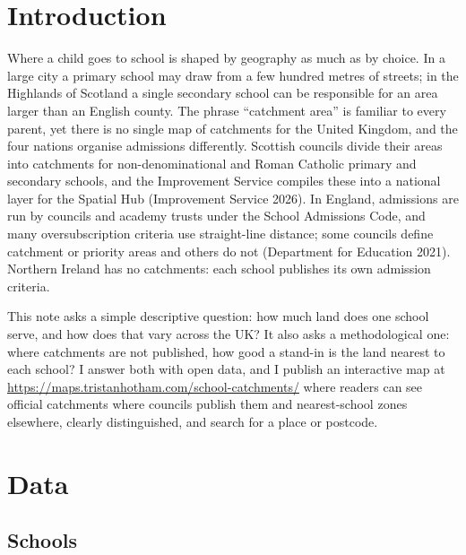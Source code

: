 \documentclass[11pt,a4paper]{article}
\begin{document}
\section{Introduction}

Where a child goes to school is shaped by geography as much as by choice. In a large city a primary school may draw from a few hundred metres of streets; in the Highlands of Scotland a single secondary school can be responsible for an area larger than an English county. The phrase ``catchment area'' is familiar to every parent, yet there is no single map of catchments for the United Kingdom, and the four nations organise admissions differently. Scottish councils divide their areas into catchments for non-denominational and Roman Catholic primary and secondary schools, and the Improvement Service compiles these into a national layer for the Spatial Hub (Improvement Service 2026). In England, admissions are run by councils and academy trusts under the School Admissions Code, and many oversubscription criteria use straight-line distance; some councils define catchment or priority areas and others do not (Department for Education 2021). Northern Ireland has no catchments: each school publishes its own admission criteria.

This note asks a simple descriptive question: how much land does one school serve, and how does that vary across the UK? It also asks a methodological one: where catchments are not published, how good a stand-in is the land nearest to each school? I answer both with open data, and I publish an interactive map at \url{https://maps.tristanhotham.com/school-catchments/} where readers can see official catchments where councils publish them and nearest-school zones elsewhere, clearly distinguished, and search for a place or postcode.

\section{Data}

\subsection{Schools}
\end{document}
